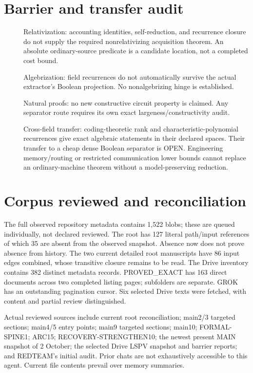 \documentclass[11pt]{article}
\begin{document}
\section*{Barrier and transfer audit}
\begin{description}
\item[] Relativization: accounting identities, self-reduction, and recurrence
closure do not supply the required nonrelativizing acquisition theorem.
An absolute ordinary-source predicate is a candidate location, not a
completed cost bound.
\item[] Algebrization: field recurrences do not automatically survive the
actual extractor's Boolean projection. No nonalgebrizing hinge is established.
\item[] Natural proofs: no new constructive circuit property is claimed.
Any separator route requires its own exact largeness/constructivity audit.
\item[] Cross-field transfer: coding-theoretic rank and characteristic-polynomial
recurrences give exact algebraic statements in their declared spaces.
Their transfer to a cheap dense Boolean separator is OPEN. Engineering
memory/routing or restricted communication lower bounds cannot replace an
ordinary-machine theorem without a model-preserving reduction.
\end{description}

\section*{Corpus reviewed and reconciliation}
The full observed repository metadata contains 1,522 blobs; these are queued
individually, not declared reviewed. The root has 127 literal path/input
references of which 35 are absent from the observed snapshot. Absence now
does not prove absence from history. The two current detailed root manuscripts
have 86 input edges combined, whose transitive closure remains to be read.
The Drive inventory contains 382 distinct metadata records. PROVED\_EXACT
has 163 direct documents across two completed listing pages; subfolders are
separate. GROK has an outstanding pagination cursor. Six selected Drive
texts were fetched, with content and partial review distinguished.

Actual reviewed sources include current root reconciliation; main2/3
targeted sections; main4/5 entry points; main9 targeted sections; main10;
FORMAL-SPINE1; ARC15; RECOVERY-STRENGTHEN10; the newest present MAIN snapshot
of 2 October; the selected Drive LSPV snapshot and barrier reports; and
REDTEAM's initial audit. Prior chats are not exhaustively accessible to this
agent. Current file contents prevail over memory summaries.
\end{document}
